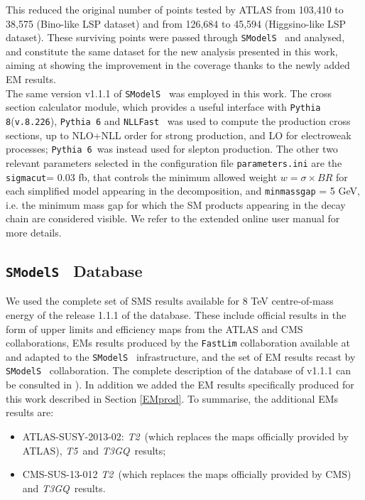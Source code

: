 \documentclass[a4paper,11pt]{article}
\newcommand{\SMO}{\texttt{SModelS\xspace}}
\newcommand{\TGQ}{ \textit{T3GQ}}
\newcommand{\Ttwo}{ \textit{T2}}
\newcommand{\Tfive}{ \textit{T5}}
\begin{document}
This reduced the original number of points tested by ATLAS from 103,410 to 38,575 (Bino-like LSP dataset) and from 126,684 to 45,594 (Higgsino-like LSP dataset). These surviving points were passed through \SMO~ and analysed, and constitute the same dataset for the new analysis presented in this work, aiming at showing the improvement in the coverage thanks to the newly added EM results. 
\\
The same version v1.1.1 of \SMO~ was employed in this work. The cross section calculator module, which provides a useful interface with \texttt{Pythia 8}(\texttt{v.8.226})\cite{Sjostrand:2014zea}, \texttt{Pythia 6}\cite{Sjostrand:2006za} and \texttt{NLLFast}~\cite{nllfast,Beenakker:1996ch,Kulesza:2008jb,Kulesza:2009kq,Beenakker:2009ha,Beenakker:2011fu,Beenakker:1997ut,Beenakker:2010nq} was used to compute the production cross sections, up to NLO+NLL order for strong production, and LO for electroweak processes; \texttt{Pythia 6}~was instead used for slepton production. The other two relevant parameters selected in the configuration file \texttt{parameters.ini} are the \texttt{sigmacut}= 0.03 fb, that controls the  minimum allowed weight  $w = \sigma \times BR$ for each simplified model appearing in the decomposition, and \verb|minmassgap| = 5 GeV, i.e. the minimum mass gap for which the SM products appearing in the decay chain are considered visible. We refer to the extended online user manual\cite{SMOMANUAL} for more details.  
%
\subsection{\SMO~ Database}
We used the complete set of SMS results available for 8 TeV centre-of-mass energy of the release 1.1.1 of the database. These include official results in the form of upper limits and efficiency maps from the ATLAS and CMS collaborations, EMs results produced by the \texttt{FastLim} collaboration available at \cite{fastlim:web} and adapted to the \SMO~ infrastructure, and the set of EM results recast by \SMO~ collaboration. The complete description of the database of v1.1.1 can be consulted in \cite{Ambrogi:2017lov}). In addition we added the EM results specifically produced for this work described in Section \ref{EMprod}. To summarise, the additional EMs results are:
\begin{itemize}
	\item ATLAS-SUSY-2013-02: \Ttwo~(which replaces the maps officially provided by ATLAS), \Tfive~and \TGQ~results; \
	\item CMS-SUS-13-012 \Ttwo~(which replaces the maps officially provided by CMS) and \TGQ~results.
\end{itemize}
\end{document}
